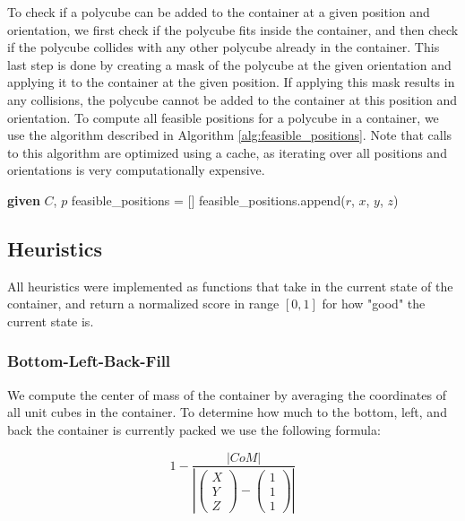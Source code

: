 \documentclass[conference]{IEEEtran}
\begin{document}
To check if a polycube can be added to the container at a given position and orientation, we first check if the polycube fits inside the container, and then check if the polycube collides with any other polycube already in the container.
This last step is done by creating a mask of the polycube at the given orientation and applying it to the container at the given position.
If applying this mask results in any collisions, the polycube cannot be added to the container at this position and orientation.
To compute all feasible positions for a polycube in a container, we use the algorithm described in Algorithm \ref{alg:feasible_positions}.
Note that calls to this algorithm are optimized using a cache, as iterating over all positions and orientations is very computationally expensive.

\begin{algorithm}[!htb]
    \caption{Feasible Positions}\label{alg:feasible_positions}
    \begin{algorithmic}[1]
    \State \textbf{given} $C$, $p$ 
    \State feasible\_positions = []
                \State feasible\_positions.append($r$, $x$, $y$, $z$)
            \EndIf
        \EndFor
    \EndFor
    \end{algorithmic}
\end{algorithm}

\subsection{Heuristics} \label{sec:implementation:heuristics}
All heuristics were implemented as functions that take in the current state of the container, and return a normalized score in range $[0, 1]$ for how "good" the current state is.

\subsubsection{Bottom-Left-Back-Fill}
We compute the center of mass of the container by averaging the coordinates of all unit cubes in the container.
To determine how much to the bottom, left, and back the container is currently packed we use the following formula:

\begin{equation}
    1 - \frac{|CoM|}{\left\lvert\begin{pmatrix}
        X \\
        Y \\
        Z
    \end{pmatrix} - \begin{pmatrix}
        1 \\
        1 \\
        1
    \end{pmatrix}\right\rvert }
    \label{eq:blbf}
\end{equation}
\end{document}
